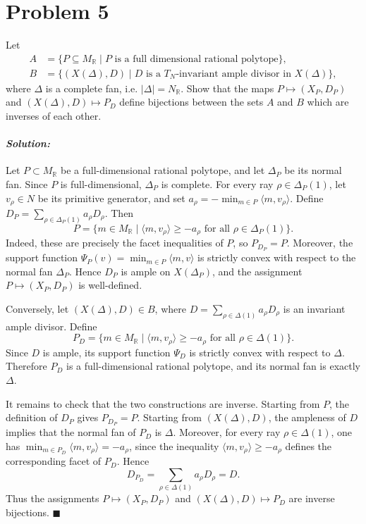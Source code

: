 \documentclass[12pt, a4paper]{article}
\newenvironment{solution}
  {\paragraph{\textit{Solution:}}\par\medskip}
  {\hfill$\blacksquare$\vspace{0.1cm}}
\begin{document}
\section*{Problem 5}
Let
\begin{align*}
    A&=\{P\subseteq M_{\mathbb{R}} \mid P \text{ is a full dimensional rational polytope}\},\\
    B&=\{(X(\Delta),D) \mid D \text{ is a } T_{N}\text{-invariant ample divisor in } X(\Delta)\},
\end{align*}
where $\Delta$ is a complete fan, i.e. $|\Delta|=N_{\mathbb{R}}$. Show that the maps $P\mapsto(X_{P},D_{P})$ and $(X(\Delta),D)\mapsto P_{D}$ define bijections between the sets $A$ and $B$ which are inverses of each other.
\begin{solution}
    Let \(P\subset M_{\mathbb R}\) be a full-dimensional rational polytope,
and let \(\Delta_P\) be its normal fan.  Since \(P\) is full-dimensional,
\(\Delta_P\) is complete.  For every ray \(\rho\in\Delta_P(1)\), let
\(v_\rho\in N\) be its primitive generator, and set
\(a_\rho=-\min_{m\in P}\langle m,v_\rho\rangle\).  Define
\(D_P=\sum_{\rho\in\Delta_P(1)}a_\rho D_\rho\).  Then
\[
P=
\{m\in M_{\mathbb R}\mid
\langle m,v_\rho\rangle\ge -a_\rho
\text{ for all }\rho\in\Delta_P(1)\}.
\]
Indeed, these are precisely the facet inequalities of \(P\), so
\(P_{D_P}=P\).  Moreover, the support function
\(\Psi_P(v)=\min_{m\in P}\langle m,v\rangle\) is strictly convex with
respect to the normal fan \(\Delta_P\).  Hence \(D_P\) is ample on
\(X(\Delta_P)\), and the assignment \(P\mapsto (X_P,D_P)\) is
well-defined.

Conversely, let \((X(\Delta),D)\in B\), where
\(D=\sum_{\rho\in\Delta(1)}a_\rho D_\rho\) is an invariant ample divisor.
Define
\[
P_D=
\{m\in M_{\mathbb R}\mid
\langle m,v_\rho\rangle\ge -a_\rho
\text{ for all }\rho\in\Delta(1)\}.
\]
Since \(D\) is ample, its support function \(\Psi_D\) is strictly convex
with respect to \(\Delta\).  Therefore \(P_D\) is a full-dimensional
rational polytope, and its normal fan is exactly \(\Delta\).

It remains to check that the two constructions are inverse.  Starting
from \(P\), the definition of \(D_P\) gives \(P_{D_P}=P\).  Starting from
\((X(\Delta),D)\), the ampleness of \(D\) implies that the normal fan of
\(P_D\) is \(\Delta\).  Moreover, for every ray \(\rho\in\Delta(1)\),
one has \(\min_{m\in P_D}\langle m,v_\rho\rangle=-a_\rho\), since the
inequality \(\langle m,v_\rho\rangle\ge -a_\rho\) defines the
corresponding facet of \(P_D\).  Hence
\[
D_{P_D}
=
\sum_{\rho\in\Delta(1)}a_\rho D_\rho
=
D.
\]
Thus the assignments \(P\mapsto (X_P,D_P)\) and
\((X(\Delta),D)\mapsto P_D\) are inverse bijections.
\end{solution}
\end{document}
